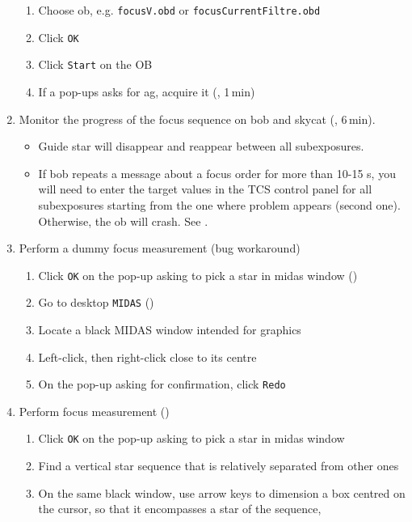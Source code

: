 \documentclass[11pt,fleqn,a4paper]{book}
\begin{document}
\begin{enumerate}
\begin{enumerate}
        \item Choose ob, e.g. \texttt{focusV.obd} or \texttt{focusCurrentFiltre.obd}
        \item Click \texttt{OK}
        \item Click \texttt{Start} on the OB
        \item If a pop-ups asks for \gls{ag}, acquire it (, 1\,min)
    \end{enumerate}
    \item Monitor the progress of the focus sequence on \gls{bob} and \gls{skycat} (, 6\,min).
    \begin{itemize}
        \item Guide star will disappear and reappear between all subexposures.
        \item If bob repeats a message about a \gls{focus} order for more than 10-15 s, you will need to enter the target values in the \gls{TCS control panel} for all subexposures starting from the one where problem appears (second one). Otherwise, the ob will crash.  See .
    \end{itemize}
    \item Perform a dummy focus measurement (bug workaround)
    \begin{enumerate}
        \item Click \texttt{OK} on the pop-up asking to pick a star in \gls{midas} window ()
        \item Go to \gls{desktop} \texttt{MIDAS} ()
        \item Locate a black MIDAS window intended for graphics
        \item Left-click, then right-click close to its centre
        \item On the pop-up asking for confirmation, click \texttt{Redo}
    \end{enumerate}
    \item Perform focus measurement ()
    \begin{enumerate}
        \item Click \texttt{OK} on the pop-up asking to pick a star in \gls{midas} window
        \item Find a vertical star sequence that is relatively separated from other ones
        \item On the same black window, use arrow keys to dimension a box
         centred on the cursor, so that it encompasses a star of the sequence,

\end{enumerate}
\end{enumerate}
\end{document}
